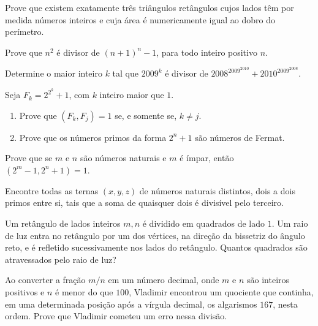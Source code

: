\documentclass[10pt,a4paper]{article}
\begin{document}
	\begin{prob}
		Prove que existem exatamente três triângulos retângulos cujos lados têm por medida números inteiros e cuja área é numericamente igual ao dobro do perímetro.
	\end{prob}
	
	\begin{prob}
		Prove que $n^2$ é divisor de $(n+1)^n-1$, para todo inteiro positivo $n$.
	\end{prob}
	
	\begin{prob}
		Determine o maior inteiro $k$ tal que $2009^k$ é divisor de $2008^{2009^{2010}}+2010^{2009^{2008}}.$
	\end{prob}
	
	\begin{prob}
		Seja $F_k=2^{2^k}+1$, com $k$ inteiro maior que $1$.
		\begin{enumerate}[label = (\alph*)]
			\item Prove que $(F_k,F_j)=1$ se, e somente se, $k\neq j$.
			\item Prove que os números primos da forma $2^n+1$ são números de Fermat.	
		\end{enumerate}
	\end{prob}
	
	\begin{prob}
			Prove que se $m$ e $n$ são números naturais e $m$ é ímpar, então $\left(2^m-1,2^n+1\right)=1$.
	\end{prob}
	
	\begin{prob}
			Encontre todas as ternas $(x, y, z)$ de números naturais distintos, dois a dois primos entre si, tais que a soma de quaisquer dois é divisível pelo terceiro.
	\end{prob}
	
	\begin{prob}  Um retângulo de lados inteiros $m,n$ é dividido em quadrados de lado $1$. Um raio de luz entra no retângulo por um dos vértices, na direção da bissetriz do ângulo reto, e é refletido sucessivamente nos lados do retângulo. Quantos quadrados são atravessados pelo raio de luz?
	\end{prob}
	
	\begin{prob} Ao converter a fração $m/n$ em um número decimal, onde $m$ e $n$ são inteiros positivos e $n$ é menor do que $100$, Vladimir encontrou um quociente que continha, em uma determinada posição após a vírgula decimal, os algarismos $167$, nesta ordem. Prove que Vladimir cometeu um erro nessa divisão.
	\end{prob}
	
\end{document}
